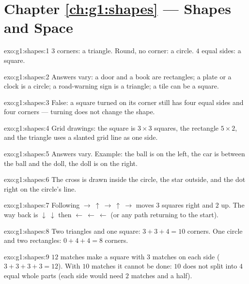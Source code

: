 \section*{Chapter \ref{ch:g1:shapes} --- Shapes and Space}

\begin{solution}{exo:g1:shapes:1}
$3$ corners: a triangle. Round, no corner: a circle. $4$ equal
sides: a square.
\end{solution}

\begin{solution}{exo:g1:shapes:2}
Answers vary: a door and a book are rectangles; a plate or a clock
is a circle; a road-warning sign is a triangle; a tile can be a
square.
\end{solution}

\begin{solution}{exo:g1:shapes:3}
False: a square turned on its corner still has four equal sides and
four corners --- turning does not change the shape.
\end{solution}

\begin{solution}{exo:g1:shapes:4}
Grid drawings: the square is $3 \times 3$ squares, the rectangle
$5 \times 2$, and the triangle uses a slanted grid line as one
side.
\end{solution}

\begin{solution}{exo:g1:shapes:5}
Answers vary. Example: the ball is on the left, the car is between
the ball and the doll, the doll is on the right.
\end{solution}

\begin{solution}{exo:g1:shapes:6}
The cross is drawn inside the circle, the star outside, and the dot
right on the circle's line.
\end{solution}

\begin{solution}{exo:g1:shapes:7}
Following $\to\ \uparrow\ \to\ \uparrow\ \to$ moves $3$ squares
right and $2$ up. The way back is $\downarrow\ \downarrow$ then
$\leftarrow\ \leftarrow\ \leftarrow$ (or any path returning to the
start).
\end{solution}

\begin{solution}{exo:g1:shapes:8}
Two triangles and one square: $3 + 3 + 4 = 10$ corners. One circle
and two rectangles: $0 + 4 + 4 = 8$ corners.
\end{solution}

\begin{solution}{exo:g1:shapes:9}
$12$ matches make a square with $3$ matches on each side
($3 + 3 + 3 + 3 = 12$). With $10$ matches it cannot be done: $10$
does not split into $4$ equal whole parts (each side would need
$2$ matches and a half).
\end{solution}
